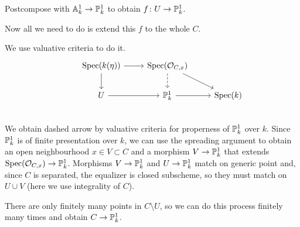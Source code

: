 \begin{exercise}{1}
\begin{enumerate}[label=(\roman*)]
{                Postcompose with $\mathbb{A}^1_k \to \mathbb{P}^1_k$ to obtain $f \colon U \to
                \mathbb{P}^1_k$.

                Now all we need to do is extend this $f$ to the whole $C$.

                We use valuative criteria to do it.
                \begin{equation*}
                    \begin{tikzcd}
                        & \Spec(k(\eta)) \arrow{r} \arrow{d} &
                        \Spec(\mathcal{O}_{C, x}) \arrow[d, dashrightarrow] \arrow{dr} \\
                        & U \arrow{r} & \Proj^1_k \arrow{r} & \Spec(k) \\
                    \end{tikzcd}
                \end{equation*}
                We obtain dashed arrow by valuative criteria for properness of
                $\mathbb{P}^1_k$ over $k$.
                Since $\mathbb{P}^1_k$ is of finite presentation over $k$, we can use
                the spreading argument to obtain an open neighbourhood $x \in V \subset C$
                and a morphism $V \to \mathbb{P}^1_k$ that extends
                $\operatorname{Spec}(\mathcal{O}_{C, x}) \to \mathbb{P}^1_k$.
                Morphisms $V \to \mathbb{P}^1_k$ and $U \to \mathbb{P}^1_k$ match on generic
                point and, since $C$ is separated, the equalizer is closed
                subscheme, so they must match on $U \cup V$ (here we use
                integrality of $C$).

                There are only finitely many points in $C \setminus U$, so we
                can do this process finitely many times and obtain $C \to
                \mathbb{P}^1_k$.

}
\end{enumerate}
\end{exercise}
